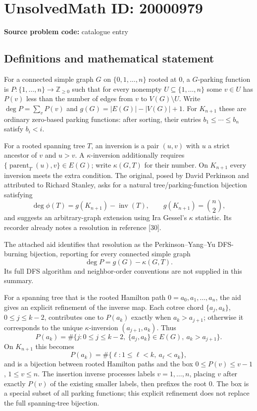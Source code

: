 \documentclass[11pt]{article}
\newcommand{\Z}{\mathbb{Z}}
\begin{document}
\section*{UnsolvedMath ID: 20000979}
\textbf{Source problem code:} catalogue entry
\subsection{Definitions and mathematical statement}
For a connected simple graph $G$ on $\{0,1,\ldots,n\}$ rooted at $0$, a $G$-parking function is $P:\{1,\ldots,n\}\to\Z_{\ge0}$ such that for every nonempty $U\subseteq\{1,\ldots,n\}$ some $v\in U$ has $P(v)$ less than the number of edges from $v$ to $V(G)\setminus U$. Write $\deg P=\sum_vP(v)$ and $g(G)=|E(G)|-|V(G)|+1$. For $K_{n+1}$ these are ordinary zero-based parking functions: after sorting, their entries $b_1\le\cdots\le b_n$ satisfy $b_i<i$.

For a rooted spanning tree $T$, an inversion is a pair $(u,v)$ with $u$ a strict ancestor of $v$ and $u>v$. A $\kappa$-inversion additionally requires $\{\operatorname{parent}_T(u),v\}\in E(G)$; write $\kappa(G,T)$ for their number. On $K_{n+1}$ every inversion meets the extra condition. The original, posed by David Perkinson and attributed to Richard Stanley, asks for a natural tree/parking-function bijection satisfying
\[
\deg\phi(T)=g(K_{n+1})-\operatorname{inv}(T),\qquad g(K_{n+1})=\binom n2,
\]
and suggests an arbitrary-graph extension using Ira Gessel's $\kappa$ statistic. Its recorder already notes a resolution in reference [30].

The attached aid identifies that resolution as the Perkinson--Yang--Yu DFS-burning bijection, reporting for every connected simple graph
\[
\deg P=g(G)-\kappa(G,T).
\]
Its full DFS algorithm and neighbor-order conventions are not supplied in this summary.

For a spanning tree that is the rooted Hamilton path $0=a_0,a_1,\ldots,a_n$, the aid gives an explicit refinement of the inverse map. Each cotree chord $\{a_j,a_k\}$, $0\le j\le k-2$, contributes one to $P(a_k)$ exactly when $a_k>a_{j+1}$; otherwise it corresponds to the unique $\kappa$-inversion $(a_{j+1},a_k)$. Thus
\[
P(a_k)=\#\{j:0\le j\le k-2,\ \{a_j,a_k\}\in E(G),\ a_k>a_{j+1}\}.
\]
On $K_{n+1}$ this becomes
\[
P(a_k)=\#\{\ell:1\le\ell<k,\ a_\ell<a_k\},
\]
and is a bijection between rooted Hamilton paths and the box $0\le P(v)\le v-1$, $1\le v\le n$. The insertion inverse processes labels $v=1,\ldots,n$, placing $v$ after exactly $P(v)$ of the existing smaller labels, then prefixes the root $0$. The box is a special subset of all parking functions; this explicit refinement does not replace the full spanning-tree bijection.
\end{document}
